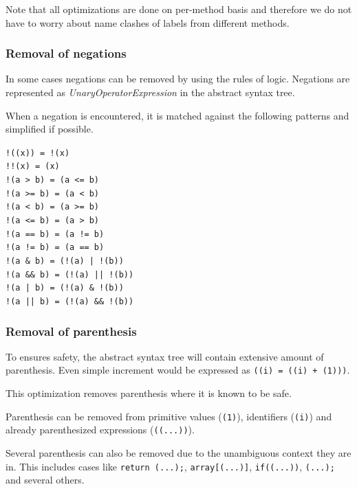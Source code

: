 \documentclass[12pt,twoside,notitlepage]{report}
\begin{document}
Note that all optimizations are done on per-method basis
and therefore we do not have to worry about name clashes
of labels from different methods.


\subsubsection{Removal of negations}
        \label{Removal of negations}

In some cases negations can be removed by using the rules of
logic.  Negations are represented as \emph{UnaryOperatorExpression}
in the abstract syntax tree.

When a negation is encountered, it is matched against the following 
patterns and simplified if possible.

\verb|!((x)) = !(x)| \\
\verb|!!(x) = (x)| \\
\verb|!(a > b) = (a <= b)| \\
\verb|!(a >= b) = (a < b)| \\
\verb|!(a < b) = (a >= b)| \\
\verb|!(a <= b) = (a > b)| \\
\verb|!(a == b) = (a != b)| \\
\verb|!(a != b) = (a == b)| \\
\verb:!(a & b) = (!(a) | !(b)): \\
\verb:!(a && b) = (!(a) || !(b)): \\
\verb:!(a | b) = (!(a) & !(b)): \\ 
\verb:!(a || b) = (!(a) && !(b)): \\

\subsubsection{Removal of parenthesis}
        \label{Removal of parenthesis}

To ensures safety, the abstract syntax tree will contain extensive
amount of parenthesis.  Even simple increment would be expressed
as \verb|((i) = ((i) + (1)))|.

This optimization removes parenthesis where it is known to be safe.

Parenthesis can be removed from primitive values (\verb|(1)|),
identifiers (\verb|(i)|) and already parenthesized expressions 
(\verb|((...))|).

Several parenthesis can also be removed due to the unambiguous
context they are in.  This includes cases like
\verb|return (...);|, \verb|array[(...)]|, \verb|if((...))|, 
\verb|(...);| and several others.
\end{document}
